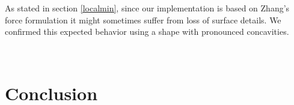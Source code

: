 \documentclass{article}
\begin{document}
As stated in section \ref{localmin}, since our implementation is based on
Zhang's force formulation it might sometimes suffer from loss of surface
details. We confirmed this expected behavior using a shape with pronounced
concavities.

\begin{figure}[H]
  \centering
  ~
\end{figure}


\section{Conclusion}



\end{document}
